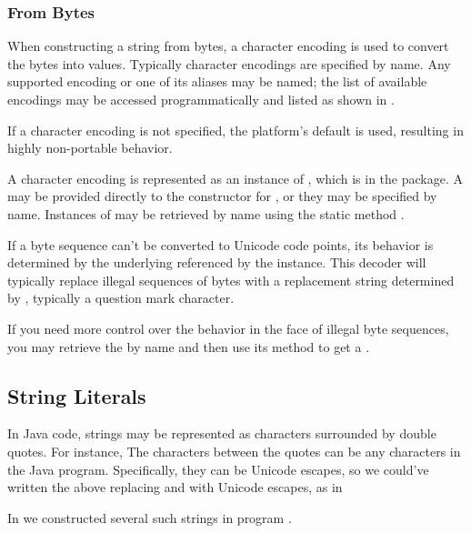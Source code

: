 \subsubsection{From Bytes}

When constructing a string from bytes, a character encoding is used to
convert the bytes into  values.  Typically character
encodings are specified by name.  Any supported encoding or one of its
aliases may be named; the list of available encodings may be accessed
programmatically and listed as shown in .

If a character encoding is not specified, the platform's default is
used, resulting in highly non-portable behavior.

A character encoding is represented as an instance of ,
which is in the  package.  A  may
be provided directly to the constructor for , or they may
be specified by name.  Instances of  may be retrieved by
name using the static method .

If a byte sequence can't be converted to Unicode code points, its
behavior is determined by the underlying 
referenced by the  instance.  This decoder will
typically replace illegal sequences of bytes with a replacement string
determined by , typically a
question mark character.  

If you need more control over the behavior in the face of illegal byte
sequences, you may retrieve the  by name and then use
its  method to get a .

\subsection{String Literals}

In Java code, strings may be represented as characters surrounded
by double quotes.  For instance,
%
%
The characters between the quotes can be any characters in the Java
program.  Specifically, they can be Unicode escapes, so we could've
written the above replacing  and  with Unicode
escapes, as in
%

In  we constructed several such strings
in program .
%
%

